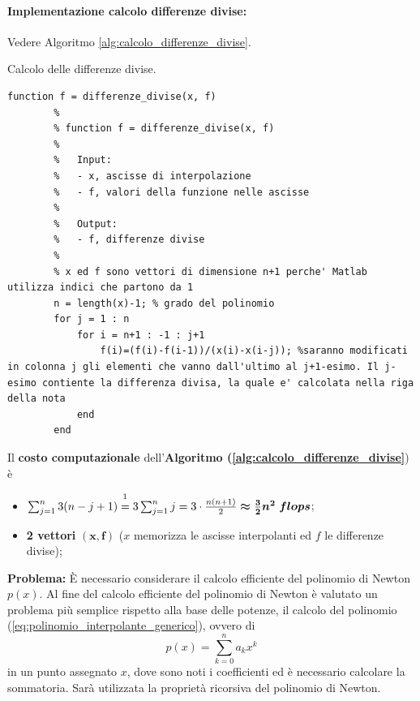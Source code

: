 \paragraph{Implementazione calcolo differenze divise:} Vedere Algoritmo \ref{alg:calcolo_differenze_divise}.

\begin{algorithm}
\caption{Calcolo delle differenze divise.}\label{alg:calcolo_differenze_divise}
    \begin{lstlisting}[style=Matlab-editor]
    	function f = differenze_divise(x, f)
    	%
    	% function f = differenze_divise(x, f)
    	%
    	%	Input:
        %	- x, ascisse di interpolazione
        % 	- f, valori della funzione nelle ascisse
        %
        %	Output:
        %	- f, differenze divise
        %
        % x ed f sono vettori di dimensione n+1 perche' Matlab utilizza indici che partono da 1
        n = length(x)-1; % grado del polinomio
        for j = 1 : n
            for i = n+1 : -1 : j+1
                f(i)=(f(i)-f(i-1))/(x(i)-x(i-j)); %saranno modificati in colonna j gli elementi che vanno dall'ultimo al j+1-esimo. Il j-esimo contiente la differenza divisa, la quale e' calcolata nella riga della nota
            end
        end
    \end{lstlisting}
\end{algorithm}

\begin{remark} Il \textbf{costo computazionale} dell'\textbf{Algoritmo (\ref{alg:calcolo_differenze_divise}}) è
    \begin{itemize}
        \item $\sum_{j=1}^{n}3(n-j+1)\overset{\footnotemark}{=} 3\sum_{j=1}^{n}j=3\cdot\frac{n(n+1)}{2}\boldsymbol{\approx \frac{3}{2}n^2\; flops}$; 
        \item \textbf{2 vettori} $\boldsymbol{(x, f)}$ ($x$ memorizza le ascisse interpolanti ed $f$ le differenze divise);
    \end{itemize}
\end{remark}

\noindent\textbf{Problema:} È necessario considerare il calcolo efficiente del polinomio di Newton $p(x)$. Al fine del calcolo efficiente del polinomio di Newton è valutato un problema più semplice rispetto alla base delle potenze, il calcolo del polinomio (\ref{eq:polinomio_interpolante_generico}), ovvero di
\begin{equation}\label{eq:polinomio_generico_ridef}
	p(x)=\sum_{k=0}^{n}a_kx^k
\end{equation}
in un punto assegnato $x$, dove sono noti i coefficienti ed è necessario calcolare la sommatoria. Sarà utilizzata la proprietà ricorsiva del polinomio di Newton.

